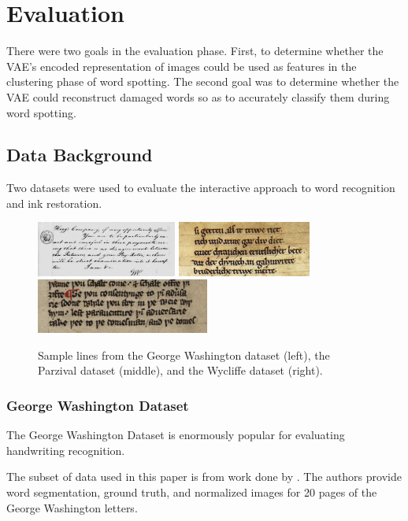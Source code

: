 \documentclass[final]{ukthesis}
\begin{document}
\chapter{Evaluation}
There were two goals in the evaluation phase. First, to determine whether the VAE's encoded representation of images could be used as features in the clustering phase of word spotting. The second goal was to determine whether the VAE could reconstruct damaged words so as to accurately classify them during word spotting.


%
%
\section{Data Background}
Two datasets were used to evaluate the interactive approach to word recognition and ink restoration.


\begin{figure}[t]
\begin{center}
\includegraphics[height=1.8cm]{gw-sample}
\includegraphics[height=1.8cm]{parzival-sample}
\includegraphics[height=1.8cm]{wycliffe-sample}
\end{center}
\caption{Sample lines from the George Washington dataset (left), the Parzival dataset (middle), and the Wycliffe dataset (right).}
\label{fig:dataset-samples}
\end{figure}


\subsection{George Washington Dataset}
The George Washington Dataset is enormously popular for evaluating handwriting recognition.

The subset of data used in this paper is from work done by \cite{fischer2012lexicon}. The authors provide word segmentation, ground truth, and normalized images for 20 pages of the George Washington letters.
\end{document}
